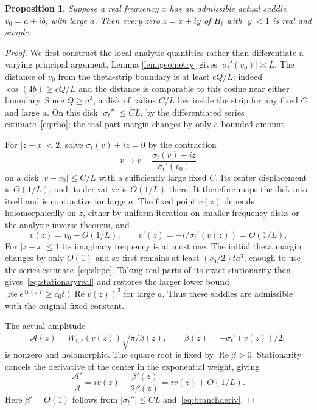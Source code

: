 \documentclass[11pt]{article}
\newtheorem{proposition}[theorem]{Proposition}
\theoremstyle{remark}\newtheorem{remark}[theorem]{Remark}
\DeclareMathOperator{\Rea}{Re}\DeclareMathOperator{\Ima}{Im}
\begin{document}
\begin{proposition}\label{prop:localactual}
Suppose a real frequency $x$ has an admissible actual saddle
$v_0=a+ib$, with large $a$. Then every zero $z=x+iy$ of
$H_t$ with $|y|<1$ is real and simple.
\end{proposition}
\begin{proof}
We first construct the local analytic quantities rather than
differentiate a varying principal argument. Lemma
\ref{lem:geometry} gives $|\sigma_t'(v_0)|\asymp L$.
The distance of $v_0$ from the theta-strip boundary is at
least $cQ/L$: indeed $\cos(4b)\geq cQ/L$ and the distance
is comparable to this cosine near either boundary.
Since $Q\geq a^3$, a disk of radius $C/L$ lies inside the
strip for any fixed $C$ and large $a$.
On this disk $|\sigma_t''|\leq CL$, by the differentiated
series estimate~\eqref{eq:rho}; the real-part margin changes
by only a bounded amount.

For $|z-x|<2$, solve
$\sigma_t(v)+iz=0$ by the contraction
\[
 v\longmapsto v-
       \frac{\sigma_t(v)+iz}{\sigma_t'(v_0)}
\]
on a disk $|v-v_0|\leq C/L$ with a sufficiently large fixed
$C$. Its center displacement is $O(1/L)$, and its derivative
is $O(1/L)$ there. It therefore maps the disk into itself and
is contractive for large $a$. The fixed point $v(z)$ depends
holomorphically on $z$, either by uniform iteration on smaller
frequency disks or the analytic inverse theorem, and
\begin{equation}\label{eq:branchderiv}
 v(z)=v_0+O(1/L),\qquad v'(z)=-i/\sigma_t'(v(z))=O(1/L).
\end{equation}
For $|z-x|\leq1$ its imaginary frequency is at most one.
The initial theta margin changes by only $O(1)$ and so first
remains at least $(c_0/2)ta^3$, enough to use the series
estimate~\eqref{eq:slope}. Taking real parts of its exact
stationarity then gives~\eqref{eq:stationaryreal} and restores
the larger lower bound $\Rea e^{4v(z)}\geq c_0t(\Rea v(z))^3$
for large $a$. Thus these saddles are admissible with the
original fixed constant.

The actual amplitude
\[
 \mathcal A(z)=W_{t,z}(v(z))\sqrt{\pi/\beta(z)},\qquad
 \beta(z)=-\sigma_t'(v(z))/2,
\]
is nonzero and holomorphic. The square root is fixed by
$\Rea\beta>0$. Stationarity cancels the derivative of the
center in the exponential weight, giving
\begin{equation}\label{eq:amplitudederiv}
 \frac{\mathcal A'}{\mathcal A}
     =iv(z)-\frac{\beta'(z)}{2\beta(z)}
     =iv(z)+O(1/L).
\end{equation}
Here $\beta'=O(1)$ follows from
$|\sigma_t''|\leq CL$ and~\eqref{eq:branchderiv}.


\end{proof}
\end{document}
